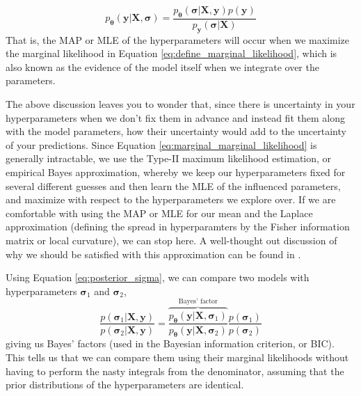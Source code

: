\documentclass{article}
\begin{document}
\begin{equation}
    p_{\boldsymbol{\theta}}(\mathbf{y}|\mathbf{X},\boldsymbol{\sigma})=\frac{p_\boldsymbol{\theta}(\boldsymbol{\sigma}|\mathbf{X},\mathbf{y})p(\mathbf{y})}{p_{\mathbf{y}}(\boldsymbol{\sigma}|\mathbf{X})}
\end{equation}
That is, the MAP or MLE of the hyperparameters will occur when we maximize the marginal likelihood in Equation \ref{eq:define_marginal_likelihood}, which is also known as the evidence of the model itself when we integrate over the parameters.

The above discussion leaves you to wonder that, since there is uncertainty in your hyperparameters when we don't fix them in advance and instead fit them along with the model parameters, how their uncertainty would add to the uncertainty of your predictions. Since Equation \ref{eq:marginal_marginal_likelihood} is generally intractable, we use the Type-II maximum likelihood estimation, or empirical Bayes approximation, whereby we keep our hyperparameters fixed for several different guesses and then learn the MLE of the influenced parameters, and maximize with respect to the hyperparameters we explore over. If we are comfortable with using the MAP or MLE for our mean and the Laplace approximation (defining the spread in hyperparamters by the Fisher information matrix or local curvature), we can stop here. A well-thought out discussion of why we should be satisfied with this approximation can be found in \cite{MacKay99}.

Using Equation \ref{eq:posterior_sigma}, we can compare two models with hyperparameters $\boldsymbol{\sigma}_1$ and $\boldsymbol{\sigma}_2$, 
\begin{equation}\frac{p(\boldsymbol{\sigma}_1|\mathbf{X},\mathbf{y})}{p(\boldsymbol{\sigma}_2|\mathbf{X},\mathbf{y})}=\overbrace{\frac{p_{\boldsymbol{\theta}}(\mathbf{y}|\mathbf{X},\boldsymbol{\sigma}_1)}{p_{\boldsymbol{\theta}}(\mathbf{y}|\mathbf{X},\boldsymbol{\sigma}_2)}}^\text{Bayes' factor}\frac{p(\boldsymbol{\sigma}_1)}{p(\boldsymbol{\sigma}_2)}\end{equation}giving us Bayes' factors (used in the Bayesian information criterion, or BIC). This tells us that we can compare them using their marginal likelihoods without having to perform the nasty integrals from the denominator, assuming that the prior distributions of the hyperparameters are identical.
\end{document}
